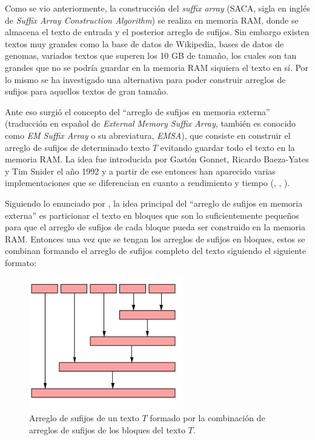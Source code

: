 Como se vio anteriormente, la construcción del \textit{suffix array} (SACA, sigla en inglés de \textit{Suffix Array Construction Algorithm}) se realiza en memoria RAM, donde se almacena el texto de entrada y el posterior arreglo de sufijos. Sin embargo existen textos muy grandes como la base de datos de Wikipedia, bases de datos de genomas, variados textos que superen los 10 GB de tamaño, los cuales son tan grandes que no se podría guardar en la memoria RAM siquiera el texto en sí. Por lo mismo se ha investigado una alternativa para poder construir arreglos de sufijos para aquellos textos de gran tamaño.

Ante eso surgió el concepto del ``arreglo de sufijos en memoria externa'' (traducción en español de \textit{External Memory Suffix Array}, también es conocido como \textit{EM Suffix Array} o su abreviatura, \textit{EMSA}), que consiste en construir el arreglo de sufijos de determinado texto $T$ evitando guardar todo el texto en la memoria RAM. La idea fue introducida por Gastón Gonnet, Ricardo Baeza-Yates y Tim Snider el año 1992 \cite{newindices} y a partir de ese entonces han aparecido varias implementaciones que se diferencian en cuanto a rendimiento y tiempo (\cite{better}, \cite{esais}, \cite{sascan}).

Siguiendo lo enunciado por \cite{sascan}, la idea principal del ``arreglo de sufijos en memoria externa'' es particionar el texto en bloques que son lo suficientemente pequeños para que el arreglo de sufijos de cada bloque pueda ser construido en la memoria RAM. Entonces una vez que se tengan los arreglos de sufijos en bloques, estos se combinan formando el arreglo de sufijos completo del texto siguiendo el siguiente formato: 

\begin{figure}[!htb]
    \centering
    \includegraphics[width=0.6\textwidth]{./images/combinacionsascan.png}
    \caption{Arreglo de sufijos de un texto $T$ formado por la combinación de arreglos de sufijos de los bloques del texto $T$.}
    \label{fig:comb1}
\end{figure}

